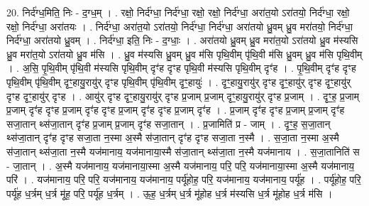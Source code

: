 \documentclass[17pt]{extarticle}
\begin{document}
20. निर्द॑ग्ध॒मिति॒ निः - द॒ग्ध॒म् । . रक्षो॒ निर्द॑ग्धा॒ निर्द॑ग्धा॒ रक्षो॒ रक्षो॒ निर्द॑ग्धा॒ अरा॑त॒यो ऽरा॑तयो॒ निर्द॑ग्धा॒ रक्षो॒ रक्षो॒ निर्द॑ग्धा॒ अरा॑तयः । . निर्द॑ग्धा॒ अरा॑त॒यो ऽरा॑तयो॒ निर्द॑ग्धा॒ निर्द॑ग्धा॒ अरा॑तयो ध्रु॒वम् ध्रु॒व मरा॑तयो॒ निर्द॑ग्धा॒ निर्द॑ग्धा॒ अरा॑तयो ध्रु॒वम् । . निर्द॑ग्धा॒ इति॒ निः - द॒ग्धाः॒ । . अरा॑तयो ध्रु॒वम् ध्रु॒व मरा॑त॒यो ऽरा॑तयो ध्रु॒व म॑स्यसि ध्रु॒व मरा॑त॒यो ऽरा॑तयो ध्रु॒व म॑सि । . ध्रु॒व म॑स्यसि ध्रु॒वम् ध्रु॒व म॑सि पृथि॒वीम् पृ॑थि॒वी म॑सि ध्रु॒वम् ध्रु॒व म॑सि पृथि॒वीम् । . अ॒सि॒ पृ॒थि॒वीम् पृ॑थि॒वी म॑स्यसि पृथि॒वीम् दृꣳ॑ह दृꣳह पृथि॒वी म॑स्यसि पृथि॒वीम् दृꣳ॑ह । . पृ॒थि॒वीम् दृꣳ॑ह दृꣳह पृथि॒वीम् पृ॑थि॒वीम् दृꣳ॒॒हायु॒रायु॑र् दृꣳह पृथि॒वीम् पृ॑थि॒वीम् दृꣳ॒॒हायुः॑ । . दृꣳ॒॒हायु॒रायु॑र् दृꣳह दृꣳ॒॒हायु॑र् दृꣳह दृꣳ॒॒हायु॑र् दृꣳह दृꣳ॒॒हायु॑र् दृꣳह । . आयु॑र् दृꣳह दृꣳ॒॒हायु॒रायु॑र् दृꣳह प्र॒जाम् प्र॒जाम् दृꣳ॒॒हायु॒रायु॑र् दृꣳह प्र॒जाम् । . दृꣳ॒॒ह॒ प्र॒जाम् प्र॒जाम् दृꣳ॑ह दृꣳह प्र॒जाम् दृꣳ॑ह दृꣳह प्र॒जाम् दृꣳ॑ह दृꣳह प्र॒जाम् दृꣳ॑ह । . प्र॒जाम् दृꣳ॑ह दृꣳह प्र॒जाम् प्र॒जाम् दृꣳ॑ह सजा॒तान् थ्स॑जा॒तान् दृꣳ॑ह प्र॒जाम् प्र॒जाम् दृꣳ॑ह सजा॒तान् । . प्र॒जामिति॑ प्र - जाम् । . दृꣳ॒॒ह॒ स॒जा॒तान् थ्स॑जा॒तान् दृꣳ॑ह दृꣳह सजा॒ता न॒स्मा अ॒स्मै स॑जा॒तान् दृꣳ॑ह दृꣳह सजा॒ता न॒स्मै । . स॒जा॒ता न॒स्मा अ॒स्मै स॑जा॒तान् थ्स॑जा॒ता न॒स्मै यज॑मानाय॒ यज॑मानाया॒स्मै स॑जा॒तान् थ्स॑जा॒ता न॒स्मै यज॑मानाय । . स॒जा॒तानिति॑ स - जा॒तान् । . अ॒स्मै यज॑मानाय॒ यज॑मानाया॒स्मा अ॒स्मै यज॑मानाय॒ परि॒ परि॒ यज॑मानाया॒स्मा अ॒स्मै यज॑मानाय॒ परि॑ । . यज॑मानाय॒ परि॒ परि॒ यज॑मानाय॒ यज॑मानाय॒ पर्यू॑होह॒ परि॒ यज॑मानाय॒ यज॑मानाय॒ पर्यू॑ह । . पर्यू॑होह॒ परि॒ पर्यू॑ह ध॒र्त्रम् ध॒र्त्र मू॑ह॒ परि॒ पर्यू॑ह ध॒र्त्रम् । . ऊ॒ह॒ ध॒र्त्रम् ध॒र्त्र मू॑होह ध॒र्त्र म॑स्यसि ध॒र्त्र मू॑होह ध॒र्त्र म॑सि । \newline
\end{document}
